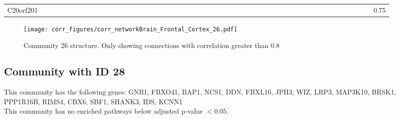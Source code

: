 \begin{longtable}{lrrrrrrrrrrrrrrrrrrrrrrrrrrrrrrrrrrrrrrrrrrrrrrrrr}
C20orf201     &               &               &            &             &             &                &              &              &            &               &            &               &            &             &               &             &               &               &              &              &             &             &              &             &             &             &             &                &               &              &               &                     &              &             &                &             &              &               &             &             &              &              &              &               &            &              &                &                 &          0.75 \\
\end{longtable}


\begin{figure}[h!]
\centering
\texttt{[image: corr\_figures/corr\_networkBrain\_Frontal\_Cortex\_26.pdf]}
\caption{Community 26 structure. Only showing connections with correlation greater than 0.8}
\end{figure}




\subsection*{Community with ID 28}
This community has the following genes: GNB1, FBXO41, BAP1, NCS1, DDN, FBXL16, JPH3, WIZ, LRP3, MAP3K10, BRSK1, PPP1R16B, RIMS4, CBX6, SBF1, SHANK3, IDS, KCNN1
\\
This community has no enriched pathways below adjusted p-value $< 0.05$.

